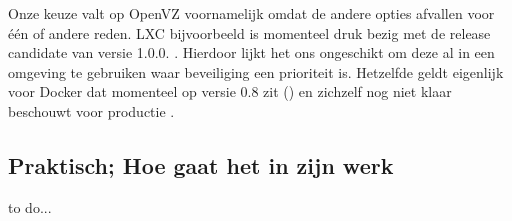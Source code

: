 Onze keuze valt op OpenVZ voornamelijk omdat de andere opties afvallen voor \'e\'en of andere reden. LXC bijvoorbeeld is momenteel druk bezig met de release candidate van versie 1.0.0. \cite{lxcbuilds}. Hierdoor lijkt het ons ongeschikt om deze al in een omgeving te gebruiken waar beveiliging een prioriteit is. Hetzelfde geldt eigenlijk voor Docker dat momenteel op versie 0.8 zit (\cite{dockerpunt8}) en zichzelf nog niet klaar beschouwt voor productie \cite{dockerv1}.

\subsection{Praktisch; Hoe gaat het in zijn werk}
to do...
